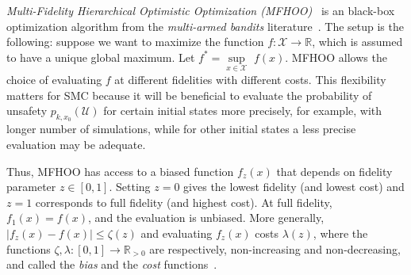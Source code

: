 \documentclass[11pt]{article}
\theoremstyle{definition}
\newcommand{\X}{\mathcal{X}}
\newcommand{\phit}[3]{{p_{#1,#2}{(#3)}}}
\newcommand{\Unsafe}{\mathcal{U}}
\begin{document}
{\em Multi-Fidelity Hierarchical Optimistic Optimization (MFHOO)}~\cite{sen2019noisy} is an black-box optimization algorithm from the  {\em multi-armed bandits} literature~\cite{munos:hal-2014,Bubeck:2011,Bubeck12}. The setup is the following: suppose we want to maximize the function $f:\X \rightarrow \mathbb{R}$, which is assumed to have a unique global maximum. Let $f^* = \underset{x\in\X}{\sup}$ $f(x)$. MFHOO allows the  choice of  evaluating  $f$ at different fidelities with different costs.
%
This flexibility matters for SMC  because it will be beneficial to evaluate the probability of unsafety $\phit{k}{x_0}{\Unsafe}$ for certain initial states more precisely, for example, with longer number of simulations, while for other initial states a less precise evaluation may be adequate.

Thus, MFHOO has access to a biased function $f_z(x)$ that depends on fidelity parameter $z \in [0,1]$.
%
Setting $z = 0$ gives the lowest fidelity (and lowest cost) and $z=1$ corresponds to full fidelity (and highest cost).
%
At full fidelity,  $f_1(x) = f(x)$, and the evaluation is unbiased. More generally, $|f_z(x)-f(x)|\leq\zeta(z)$ and evaluating $f_z(x)$ costs $\lambda(z)$, where the functions $\zeta, \lambda:[0,1]\rightarrow\mathbb{R}_{>0}$ are respectively,  non-increasing and non-decreasing, and called the {\em bias} and the {\em cost} functions~\cite{sen2019noisy}.
\end{document}
